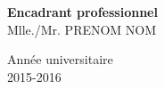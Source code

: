 \begin{center}
 \vspace{1cm}
 \begin{minipage}{6cm}
\begin{center}
\textbf{Encadrant professionnel} \\ Mlle./Mr. PRENOM NOM
\end{center}
 \end{minipage}
 
 \vspace{2cm}
 
 \begin{center}
\footnotesize{Année universitaire} \\ \footnotesize{2015-2016}
\end{center}
 






\end{center}
